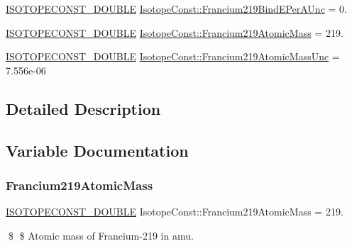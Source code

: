 \begin{DoxyCompactItemize}
\mbox{\hyperlink{group___isotope_const-_macros_ga8f45a7272ce02c0b4c65c44636ed719a}{I\+S\+O\+T\+O\+P\+E\+C\+O\+N\+S\+T\+\_\+\+D\+O\+U\+B\+LE}} \mbox{\hyperlink{group___isotope_const-_francium-_fr219_gae9e3b7385b93eeb6f3405858bf65ad03}{Isotope\+Const\+::\+Francium219\+Bind\+E\+Per\+A\+Unc}} = 0.
\item 
\mbox{\hyperlink{group___isotope_const-_macros_ga8f45a7272ce02c0b4c65c44636ed719a}{I\+S\+O\+T\+O\+P\+E\+C\+O\+N\+S\+T\+\_\+\+D\+O\+U\+B\+LE}} \mbox{\hyperlink{group___isotope_const-_francium-_fr219_ga190430194a9a06bbb9d957ce368605c3}{Isotope\+Const\+::\+Francium219\+Atomic\+Mass}} = 219.
\item 
\mbox{\hyperlink{group___isotope_const-_macros_ga8f45a7272ce02c0b4c65c44636ed719a}{I\+S\+O\+T\+O\+P\+E\+C\+O\+N\+S\+T\+\_\+\+D\+O\+U\+B\+LE}} \mbox{\hyperlink{group___isotope_const-_francium-_fr219_gaf283813bb6aee072257e0f5b8828a1cb}{Isotope\+Const\+::\+Francium219\+Atomic\+Mass\+Unc}} = 7.\+556e-\/06
\end{DoxyCompactItemize}


\subsection{Detailed Description}


\subsection{Variable Documentation}
\mbox{\label{group___isotope_const-_francium-_fr219_ga190430194a9a06bbb9d957ce368605c3}} 
\subsubsection{\texorpdfstring{Francium219\+Atomic\+Mass}{Francium219AtomicMass}}
{\footnotesize\ttfamily \mbox{\hyperlink{group___isotope_const-_macros_ga8f45a7272ce02c0b4c65c44636ed719a}{I\+S\+O\+T\+O\+P\+E\+C\+O\+N\+S\+T\+\_\+\+D\+O\+U\+B\+LE}} Isotope\+Const\+::\+Francium219\+Atomic\+Mass = 219.}

\$ \$ Atomic mass of Francium-\/219 in amu. \mbox{\label{group___isotope_const-_francium-_fr219_gaf283813bb6aee072257e0f5b8828a1cb}} 
